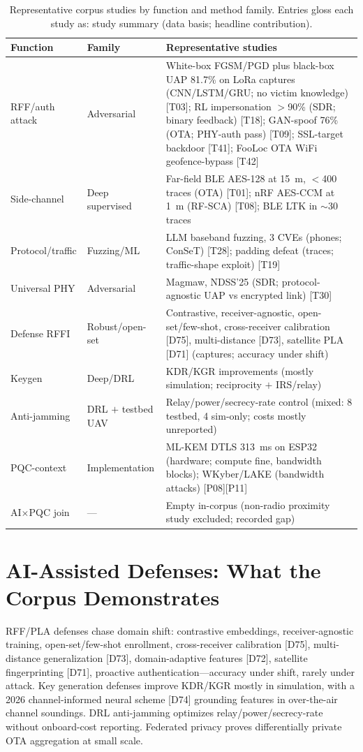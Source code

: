 \documentclass[11pt,a4paper]{article}
\begin{document}
\begin{table}[tbp]
\centering
\footnotesize
\setlength{\tabcolsep}{3pt}
\caption{Representative corpus studies by function and method family. Entries gloss each study as: study summary (data basis; headline contribution).}
\label{tab:representative}
\begin{tabular}{@{}>{\raggedright\arraybackslash}p{2.4cm} >{\raggedright\arraybackslash}p{2.4cm} >{\raggedright\arraybackslash}p{9.2cm}@{}}
\toprule
Function & Family & Representative studies \\
\midrule
RFF/auth attack & Adversarial & White-box FGSM/PGD plus black-box UAP 81.7\% on LoRa captures (CNN/LSTM/GRU; no victim knowledge) [T03]; RL impersonation $>$90\% (SDR; binary feedback) [T18]; GAN-spoof 76\% (OTA; PHY-auth pass) [T09]; SSL-target backdoor [T41]; FooLoc OTA WiFi geofence-bypass [T42] \\
Side-channel & Deep supervised & Far-field BLE AES-128 at 15~m, $<$400 traces (OTA) [T01]; nRF AES-CCM at 1~m (RF-SCA) [T08]; BLE LTK in $\sim$30 traces \\
Protocol/traffic & Fuzzing/ML & LLM baseband fuzzing, 3 CVEs (phones; ConSeT) [T28]; padding defeat (traces; traffic-shape exploit) [T19] \\
Universal PHY & Adversarial & Magmaw, NDSS'25 (SDR; protocol-agnostic UAP vs encrypted link) [T30] \\
Defense RFFI & Robust/open-set & Contrastive, receiver-agnostic, open-set/few-shot, cross-receiver calibration [D75], multi-distance [D73], satellite PLA [D71] (captures; accuracy under shift) \\
Keygen & Deep/DRL & KDR/KGR improvements (mostly simulation; reciprocity $+$ IRS/relay) \\
Anti-jamming & DRL $+$ testbed UAV & Relay/power/secrecy-rate control (mixed: 8 testbed, 4 sim-only; costs mostly unreported) \\
PQC-context & Implementation & ML-KEM DTLS 313~ms on ESP32 (hardware; compute fine, bandwidth blocks); WKyber/LAKE (bandwidth attacks) [P08][P11] \\
AI$\times$PQC join & --- & Empty in-corpus (non-radio proximity study excluded; recorded gap) \\
\bottomrule
\end{tabular}
\end{table}

\section{AI-Assisted Defenses: What the Corpus Demonstrates}
\label{sec:defense}
RFF/PLA defenses chase domain shift: contrastive embeddings, receiver-agnostic training, open-set/few-shot enrollment, cross-receiver calibration [D75], multi-distance generalization [D73], domain-adaptive features [D72], satellite fingerprinting [D71], proactive authentication---accuracy under shift, rarely under attack. Key generation defenses improve KDR/KGR mostly in simulation, with a 2026 channel-informed neural scheme [D74] grounding features in over-the-air channel soundings. DRL anti-jamming optimizes relay/power/secrecy-rate without onboard-cost reporting. Federated privacy proves differentially private OTA aggregation at small scale.
\end{document}
